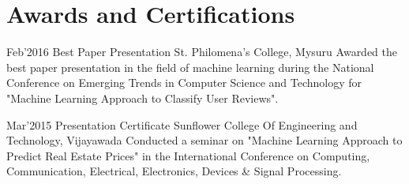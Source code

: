 \documentclass[]{friggeri-cv} %
\begin{document}
\section{Awards and Certifications}

\begin{entrylist}


\entry
{Feb'2016}
{Best Paper Presentation}
{St. Philomena's College, Mysuru}
{Awarded the best paper presentation in the field of machine learning during the National Conference on Emerging Trends in Computer Science and Technology for "Machine Learning Approach to Classify User Reviews".
\newline}


\entry
{Mar'2015}
{Presentation Certificate}
{Sunflower College Of Engineering and Technology, Vijayawada}
{Conducted a seminar on "Machine Learning Approach to Predict Real Estate Prices" in the International Conference on Computing, Communication, Electrical, Electronics, Devices \& Signal Processing.\newline  }


\end{entrylist}





\end{document}
